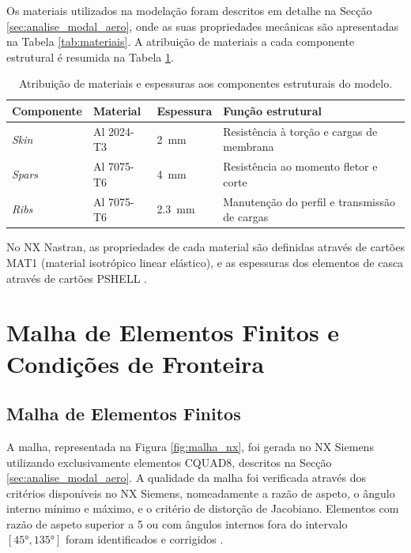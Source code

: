 \documentclass[11pt,oneside,a4paper,final]{report}
\begin{document}
Os materiais utilizados na modelação foram descritos em detalhe na Secção \ref{sec:analise_modal_aero}, onde as suas propriedades mecânicas são apresentadas na Tabela \ref{tab:materiais}. A atribuição de materiais a cada componente estrutural é resumida na Tabela \ref{tab:material_componentes}.

\begin{table}[H]
\centering
\caption{Atribuição de materiais e espessuras aos 
componentes estruturais do modelo.}
\label{tab:material_componentes}
\renewcommand{\arraystretch}{1.4}
\begin{tabularx}{\textwidth}{l l l >{\raggedright\arraybackslash}X}
\toprule
\textbf{Componente} & \textbf{Material} & \textbf{Espessura} & \textbf{Função estrutural} \\
\midrule
\textit{Skin}  & Al 2024-T3 & \SI{2}{\milli\meter}   & Resistência à torção e cargas de membrana \\
\textit{Spars} & Al 7075-T6 & \SI{4}{\milli\meter}   & Resistência ao momento fletor e corte \\
\textit{Ribs}  & Al 7075-T6 & \SI{2.3}{\milli\meter} & Manutenção do perfil e transmissão de cargas \\
\bottomrule
\end{tabularx}
\end{table}


No NX Nastran, as propriedades de cada material são definidas através de cartões MAT1 (material isotrópico linear elástico), e as espessuras dos elementos de casca através de cartões PSHELL \cite{Nastran2014}.

\section{Malha de Elementos Finitos e Condições de 
Fronteira}
\label{sec:cond_fronteira}

\subsection{Malha de Elementos Finitos}

A malha, representada na Figura \ref{fig:malha_nx}, foi gerada no NX Siemens utilizando exclusivamente elementos CQUAD8, descritos na Secção \ref{sec:analise_modal_aero}. A qualidade da malha foi verificada através dos critérios disponíveis no NX Siemens, nomeadamente a razão de aspeto, o ângulo interno mínimo e máximo, e o critério de distorção de Jacobiano. Elementos com razão de aspeto superior a 5 ou com ângulos internos fora do intervalo $[\ang{45}, \ang{135}]$ foram identificados e corrigidos \cite{Bathe2014, Cook2001}.
\end{document}
